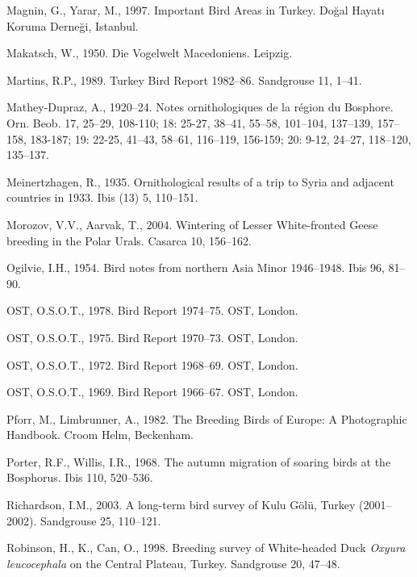\documentclass[
  a4paper,
  DIV=11,
  numbers=noendperiod]{scrartcl}
\newlength{\cslhangindent}
\newenvironment{CSLReferences}[2] %
 {\begin{list}{}{%
  \setlength{\itemindent}{0pt}
  \setlength{\leftmargin}{0pt}
  \setlength{\parsep}{0pt}
  \ifodd #1
   \setlength{\leftmargin}{\cslhangindent}
   \setlength{\itemindent}{-1\cslhangindent}
  \fi
  \setlength{\itemsep}{#2\baselineskip}}}
 {\end{list}}
\begin{document}
\begin{CSLReferences}{1}{0}
Magnin, G., Yarar, M., 1997. {Important Bird Areas in Turkey}. Doğal
Hayatı Koruma Derneği, Istanbul.

Makatsch, W., 1950. {Die Vogelwelt Macedoniens}. Leipzig.

Martins, R.P., 1989. {Turkey Bird Report 1982--86}. Sandgrouse 11,
1--41.

Mathey-Dupraz, A., 1920--24. {Notes ornithologiques de la région du
Bosphore}. Orn. Beob. 17, 25--29, 108-110; 18: 25-27, 38--41, 55--58,
101--104, 137--139, 157--158, 183-187; 19: 22-25, 41--43, 58--61,
116--119, 156-159; 20: 9-12, 24--27, 118--120, 135--137.

Meinertzhagen, R., 1935. {Ornithological results of a trip to Syria and
adjacent countries in 1933}. Ibis (13) 5, 110--151.

Morozov, V.V., Aarvak, T., 2004. {Wintering of Lesser White-fronted
Geese breeding in the Polar Urals}. Casarca 10, 156--162.

Ogilvie, I.H., 1954. {Bird notes from northern Asia Minor 1946--1948}.
Ibis 96, 81--90.

OST, O.S.O.T., 1978. {Bird Report 1974--75}. OST, London.

OST, O.S.O.T., 1975. {Bird Report 1970--73}. OST, London.

OST, O.S.O.T., 1972. {Bird Report 1968--69}. OST, London.

OST, O.S.O.T., 1969. {Bird Report 1966--67}. OST, London.

Pforr, M., Limbrunner, A., 1982. {The Breeding Birds of Europe: A
Photographic Handbook}. Croom Helm, Beckenham.

Porter, R.F., Willis, I.R., 1968. {The autumn migration of soaring birds
at the Bosphorus}. Ibis 110, 520--536.

Richardson, I.M., 2003. {A long-term bird survey of Kulu Gölü, Turkey
(2001--2002)}. Sandgrouse 25, 110--121.

Robinson, H., K., Can, O., 1998. {Breeding survey of White-headed Duck
\emph{Oxyura leucocephala} on the Central Plateau, Turkey}. Sandgrouse
20, 47--48.


\end{CSLReferences}
\end{document}

